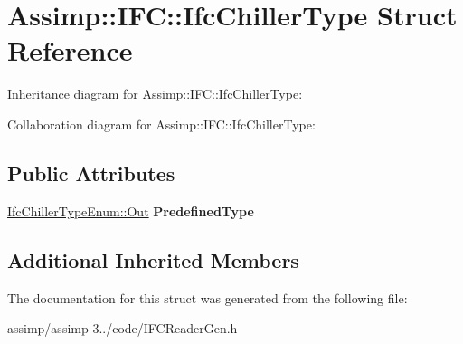 \hypertarget{struct_assimp_1_1_i_f_c_1_1_ifc_chiller_type}{\section{Assimp\+:\+:I\+F\+C\+:\+:Ifc\+Chiller\+Type Struct Reference}
\label{struct_assimp_1_1_i_f_c_1_1_ifc_chiller_type}
}


Inheritance diagram for Assimp\+:\+:I\+F\+C\+:\+:Ifc\+Chiller\+Type\+:


Collaboration diagram for Assimp\+:\+:I\+F\+C\+:\+:Ifc\+Chiller\+Type\+:
\subsection*{Public Attributes}
\begin{DoxyCompactItemize}
\item 
\hypertarget{struct_assimp_1_1_i_f_c_1_1_ifc_chiller_type_a9eee9b7b0c518ea95172a6db1606ee8e}{\hyperlink{classboost_1_1shared__ptr}{Ifc\+Chiller\+Type\+Enum\+::\+Out} {\bfseries Predefined\+Type}}\label{struct_assimp_1_1_i_f_c_1_1_ifc_chiller_type_a9eee9b7b0c518ea95172a6db1606ee8e}

\end{DoxyCompactItemize}
\subsection*{Additional Inherited Members}


The documentation for this struct was generated from the following file\+:\begin{DoxyCompactItemize}
\item 
assimp/assimp-\/3../code/I\+F\+C\+Reader\+Gen.\+h\end{DoxyCompactItemize}

